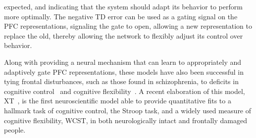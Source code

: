expected, and indicating that the system should adapt its behavior to perform more optimally.  The negative TD error can be used as a gating signal on the PFC representations, signaling the gate to open, allowing a new representation to replace the old, thereby allowing the network to flexibly adjust its control over behavior.

Along with providing a neural mechanism that can learn to appropriately and adaptively gate PFC representations, these models have also been successful in tying frontal disturbances, such as those found in schizophrenia, to deficits in cognitive control~\cite{CohenJD:1992:Schizophrenia} and cognitive flexibility~\cite{BraverTS:1999:Schizophrenia,OReillyRC:2002:IDED}.  A recent elaboration of this model, XT~\cite{RougierNP:2005:XT}, is the first neuroscientific model able to provide quantitative fits to a hallmark task of cognitive control, the Stroop task, and a widely used measure of cognitive flexibility, WCST, in both neurologically intact and frontally damaged people.  

